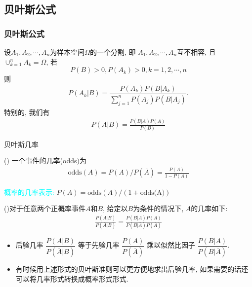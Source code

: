 \subsection{贝叶斯公式}
\begin{frame}
	\frametitle{贝叶斯公式}
	\begin{thm}
		设$A_1,A_2,\cdots,A_n$为样本空间$\Omega$的一个分割, 即 $A_1,A_2,\cdots,A_n$互不相容, 且$\cup_{k=1}^nA_k=\Omega$, 若 $$P(B)>0, P(A_k)>0, k=1,2,\cdots,n$$ 则
		\begin{eqnarray*}
			P(A_k|B)=\dfrac{P(A_k)P(B|A_k)}{\sum_{j=1}^nP(A_j)P(B|A_j)}.
		\end{eqnarray*}
	特别的, 我们有
  \begin{eqnarray*}
    P(A|B)=\frac{P(B|A)P(A)}{P(B)}
    \end{eqnarray*}
	\end{thm}
\end{frame}


\begin{frame}{贝叶斯几率}
    \begin{defi}() 一个事件的几率(odds)为
    \begin{eqnarray*}
     ​\text{odds}(A)=P(A)/P(\overline{A})=\frac{P(A)}{1-P(A)}
     \end{eqnarray*}
    \end{defi}
  \pause
  \textcolor{cyan}{概率的几率表示:} $P(A)=\text{odds}(A)/(1+\text{odds(A)}) $
  \begin{thm} ()对于任意两个正概率事件$A$和$B$, 给定以$B$为条件的情况下, $A$的几率如下:
   \begin{eqnarray*}
    \frac{P(A|B)}{P(\overline{A}| B)}=\frac{P(B| A)P(A)}{P(B| \overline{A})P(\overline{A})}
    \end{eqnarray*}
    \end{thm}
  \pause

  \begin{itemize}[<+-|alert@+>]
  \item 后验几率 $\dfrac{P(A|B)}{P(\overline{A}|B)}$ 等于先验几率 $\dfrac{P(A)}{P(\overline{A})}$ 乘以似然比因子 $\dfrac{P(B|A)}{P(B|\overline{A})}$. %
  \item 有时候用上述形式的贝叶斯准则可以更方便地求出后验几率, 如果需要的话还可以将几率形式转换成概率形式形式.
  \end{itemize}


\end{frame}




